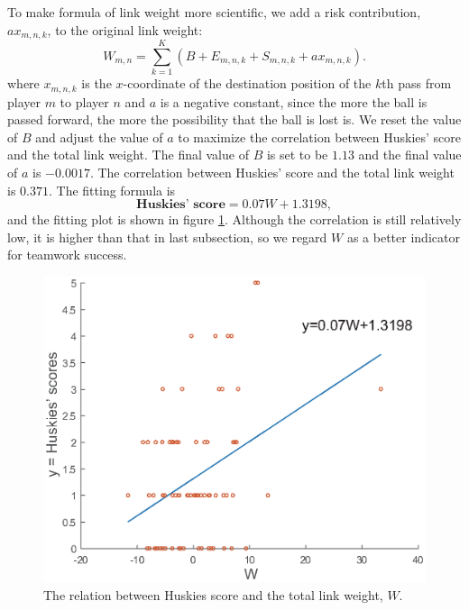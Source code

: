 \documentclass[12pt]{article}
\begin{document}
To make formula of link weight more scientific, we add a risk contribution, $ax_{m,n,k}$, to the original link weight:
\[
	W_{m,n}=\sum_{k=1}^{K}(B+E_{m,n,k}+S_{m,n,k}+ax_{m,n,k}).
\]
where $x_{m,n,k}$ is the $x$-coordinate of the destination position of the $k$th pass from player $m$ to player $n$ and $a$ is a negative constant, since the more the ball is passed forward, the more the possibility that the ball is lost is. We reset the value of $B$ and adjust the value of $a$ to maximize the correlation between Huskies' score and the total link weight. The final value of $B$ is set to be $1.13$ and the final value of $a$ is $-0.0017$. The correlation between Huskies' score and the total link weight is $0.371$. The fitting formula is
\begin{equation}
	\textbf{Huskies' score}=0.07W+1.3198,
\end{equation}
and the fitting plot is shown in figure \ref{score-W}. Although the correlation is still relatively low, it is higher than that in last subsection, so we regard $W$ as a better indicator for teamwork success.
\begin{figure}[h]
	\centering
	\includegraphics[width=.6\textwidth]{score-W.eps}
	\caption{The relation between Huskies score and the total link weight, $W$.}
	\label{score-W}
\end{figure}
\end{document}
